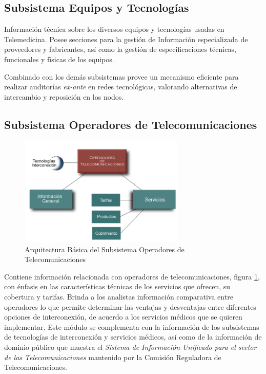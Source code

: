 \subsection{Subsistema Equipos y Tecnologías}
Información técnica sobre los diversos equipos y tecnologías usadas en Telemedicina. Posee secciones para la gestión de Información especializada de proveedores y fabricantes, así como la gestión de especificaciones técnicas, funcionales y físicas de los equipos.

Combinado con los demás subsistemas provee un mecanismo eficiente para realizar auditorías \textit{ex-ante} en redes tecnológicas, valorando alternativas de intercambio y reposición en los nodos.

\subsection{Subsistema Operadores de Telecomunicaciones}

\begin{figure}
 \centering
 \includegraphics[width=80mm, height=52mm]{operadores.png}
 \caption{Arquitectura Básica del Subsistema Operadores de Telecomunicaciones}
 \label{operadores}
\end{figure}

Contiene información relacionada con operadores de telecomunicaciones, figura \ref{operadores}, con énfasis en las características técnicas de los servicios que ofrecen, su cobertura y tarifas. Brinda a los analistas información comparativa entre operadores lo que permite determinar las ventajas y desventajas entre diferentes opciones de interconexión, de acuerdo a los servicios médicos que se quieren implementar. Este módulo se complementa con la información de los subsistemas de tecnologías de interconexión y servicios médicos, así como de la información de dominio público que muestra el \textit{Sistema de Información Unificado para el sector de las Telecomunicaciones} mantenido por la Comisión Reguladora de Telecomunicaciones.


